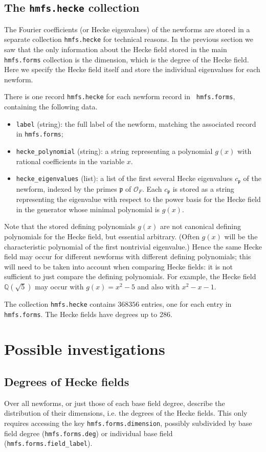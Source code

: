 \documentclass{llncs}
\def\Q{{\mathbb Q}}
\def\O{{\mathcal{O}}}
\def\p{{\mathfrak{p}}}
\begin{document}
\subsection{The {\tt hmfs.hecke} collection}
The Fourier coefficients (or Hecke eigenvalues) of the newforms are
stored in a separate collection {\tt hmfs.hecke} for technical
reasons.  In the previous section we saw that the only information
about the Hecke field stored in the main {\tt hmfs.forms} collection
is the dimension, which is the degree of the Hecke field.  Here we
specify the Hecke field itself and store the individual eigenvalues
for each newform.

There is one record {\tt hmfs.hecke} for each newform record in {\tt
  hmfs.forms}, containing the following data.
\begin{itemize}
\item {\tt label} (string): the full label of the newform, matching the
  associated record in {\tt hmfs.forms};
\item {\tt hecke\_polynomial} (string): a string representing a
  polynomial $g(x)$ with rational coefficients in the variable $x$.
\item {\tt hecke\_eigenvalues} (list): a list of the first several
  Hecke eigenvalues $c_{\p}$ of the newform, indexed by the primes
  $\p$ of $\O_F$. Each $c_{\p}$ is stored as a string representing the
  eigenvalue with respect to the power basis for the Hecke field in
  the generator whose minimal polynomial is $g(x)$.
\end{itemize}
Note that the stored defining polynomials $g(x)$ are not canonical
defining polynomials for the Hecke field, but essential arbitrary.
(Often $g(x)$ will be the characteristic polynomial of the first
nontrivial eigenvalue.)  Hence the same Hecke field may occur for
different newforms with different defining polynomials; this will need
to be taken into account when comparing Hecke fields: it is not
sufficient to just compare the defining polynomials.  For example, the
Hecke field $\Q(\sqrt{5})$ may occur with $g(x)=x^2-5$ and also with
$x^2-x-1$.

The collection {\tt hmfs.hecke} contains $368356$ entries, one for
each entry in {\tt hmfs.forms}.  The Hecke fields have degrees up to $286$.

\section{Possible investigations}
\subsection{Degrees of Hecke fields} Over all newforms, or just those
of each base field degree, describe the distribution of their
dimensions, i.e. the degrees of the Hecke fields.  This only requires
accessing the key {\tt hmfs.forms.dimension}, possibly subdivided by
base field degree ({\tt hmfs.forms.deg}) or individual base field
({\tt hmfs.forms.field\_label}).
\end{document}
